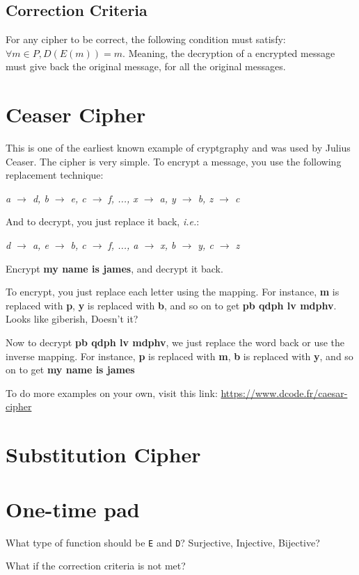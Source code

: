 \subsection{Correction Criteria}
For any cipher to be correct, the following condition must satisfy: $\forall m \in P, D(E(m)) = m$. Meaning, the decryption of a encrypted message must give
back the original message, for all the original messages.

\newpage

\section{Ceaser Cipher}

This is one of the earliest known example of cryptgraphy and was used by Julius Ceaser. The cipher is very simple. To encrypt a message, you use the 
following replacement technique:
\begin{center}
    \emph{a $\rightarrow$ d, b $\rightarrow$ e, c $\rightarrow$ f, ..., x $\rightarrow$ a, y $\rightarrow$ b, z $\rightarrow$ c}
\end{center}

And to decrypt, you just replace it back, \emph{i.e.}:
\begin{center}
    \emph{d $\rightarrow$ a, e $\rightarrow$ b, c $\rightarrow$ f, ..., a $\rightarrow$ x, b $\rightarrow$ y, c $\rightarrow$ z}
\end{center}

\begin{example}
Encrypt \textbf{my name is james}, and decrypt it back.

To encrypt, you just replace each letter using the mapping. For instance, \textbf{m} is replaced with \textbf{p},
\textbf{y} is replaced with \textbf{b}, and so on to get \textbf{pb qdph lv mdphv}. Looks like giberish, Doesn't it?

Now to decrypt \textbf{pb qdph lv mdphv}, we just replace the word back or use the inverse mapping. For instance, \textbf{p} is replaced with \textbf{m},
\textbf{b} is replaced with \textbf{y}, and so on to get \textbf{my name is james}
\end{example}

To do more examples on your own, visit this link: \href{https://www.dcode.fr/caesar-cipher}{https://www.dcode.fr/caesar-cipher}
\newpage

\section{Substitution Cipher}
\lipsum
\newpage

\section{One-time pad}
\lipsum
\newpage


\begin{problemset}
    \item What type of function should be \verb!E! and \verb!D!? Surjective, Injective, Bijective?
    \item What if the correction criteria is not met?
\end{problemset}
\newpage